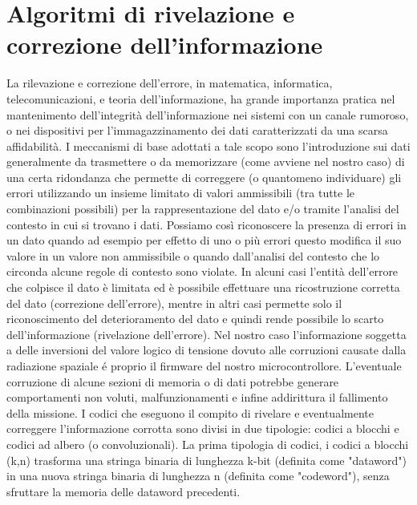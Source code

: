 \documentclass[LaM,binding=0.6cm,oneside]{../sapthesis}
\begin{document}
\chapter{Algoritmi di rivelazione e correzione dell'informazione}

La rilevazione e correzione dell'errore, in matematica, informatica, telecomunicazioni, e teoria dell'informazione, ha grande importanza pratica nel mantenimento dell'integrità dell'informazione nei sistemi con un canale rumoroso, o nei dispositivi per l'immagazzinamento dei dati caratterizzati da una scarsa affidabilità.
\newline
I meccanismi di base adottati a tale scopo sono l'introduzione sui dati generalmente da trasmettere o da memorizzare (come avviene nel nostro caso) di una certa ridondanza che permette di correggere (o quantomeno individuare) gli errori utilizzando un insieme limitato di valori ammissibili (tra tutte le combinazioni possibili) per la rappresentazione del dato e/o tramite l'analisi del contesto in cui si trovano i dati. 
\newline
Possiamo così riconoscere la presenza di errori in un dato quando ad esempio per effetto di uno o più errori questo modifica il suo valore in un valore non ammissibile o quando dall'analisi del contesto che lo circonda alcune regole di contesto sono violate. In alcuni casi l'entità dell'errore che colpisce il dato è limitata ed è possibile effettuare una ricostruzione corretta del dato (correzione dell'errore), mentre in altri casi permette solo il riconoscimento del deterioramento del dato e quindi rende possibile lo scarto dell'informazione (rivelazione dell'errore).
\newline
Nel nostro caso l'informazione soggetta a delle inversioni del valore logico di tensione dovuto alle corruzioni causate dalla radiazione spaziale é proprio il firmware del nostro microcontrollore. L'eventuale corruzione di alcune sezioni di memoria o di dati potrebbe generare comportamenti non voluti, malfunzionamenti e infine addirittura il fallimento della missione.
\newline
I codici che eseguono il compito di rivelare e eventualmente correggere l'informazione corrotta sono divisi in due tipologie: codici a blocchi e codici ad albero (o convoluzionali).
La prima tipologia di codici, i codici a blocchi (k,n)  trasforma una stringa binaria di lunghezza k-bit (definita come "dataword") in una nuova stringa binaria di lunghezza n (definita come "codeword"), senza sfruttare la memoria delle dataword precedenti.
\end{document}
